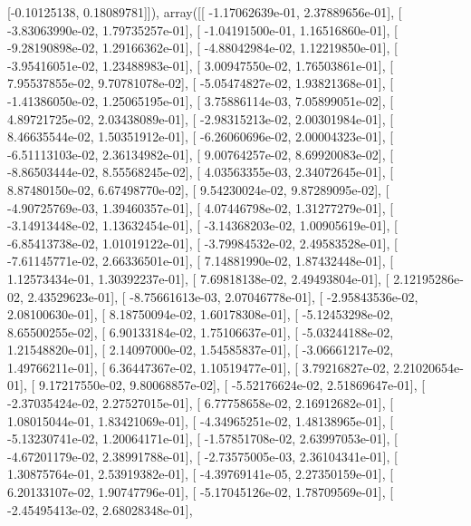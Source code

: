 \documentclass{article}
\begin{document}
       [-0.10125138,  0.18089781]]), array([[ -1.17062639e-01,   2.37889656e-01],
       [ -3.83063990e-02,   1.79735257e-01],
       [ -1.04191500e-01,   1.16516860e-01],
       [ -9.28190898e-02,   1.29166362e-01],
       [ -4.88042984e-02,   1.12219850e-01],
       [ -3.95416051e-02,   1.23488983e-01],
       [  3.00947550e-02,   1.76503861e-01],
       [  7.95537855e-02,   9.70781078e-02],
       [ -5.05474827e-02,   1.93821368e-01],
       [ -1.41386050e-02,   1.25065195e-01],
       [  3.75886114e-03,   7.05899051e-02],
       [  4.89721725e-02,   2.03438089e-01],
       [ -2.98315213e-02,   2.00301984e-01],
       [  8.46635544e-02,   1.50351912e-01],
       [ -6.26060696e-02,   2.00004323e-01],
       [ -6.51113103e-02,   2.36134982e-01],
       [  9.00764257e-02,   8.69920083e-02],
       [ -8.86503444e-02,   8.55568245e-02],
       [  4.03563355e-03,   2.34072645e-01],
       [  8.87480150e-02,   6.67498770e-02],
       [  9.54230024e-02,   9.87289095e-02],
       [ -4.90725769e-03,   1.39460357e-01],
       [  4.07446798e-02,   1.31277279e-01],
       [ -3.14913448e-02,   1.13632454e-01],
       [ -3.14368203e-02,   1.00905619e-01],
       [ -6.85413738e-02,   1.01019122e-01],
       [ -3.79984532e-02,   2.49583528e-01],
       [ -7.61145771e-02,   2.66336501e-01],
       [  7.14881990e-02,   1.87432448e-01],
       [  1.12573434e-01,   1.30392237e-01],
       [  7.69818138e-02,   2.49493804e-01],
       [  2.12195286e-02,   2.43529623e-01],
       [ -8.75661613e-03,   2.07046778e-01],
       [ -2.95843536e-02,   2.08100630e-01],
       [  8.18750094e-02,   1.60178308e-01],
       [ -5.12453298e-02,   8.65500255e-02],
       [  6.90133184e-02,   1.75106637e-01],
       [ -5.03244188e-02,   1.21548820e-01],
       [  2.14097000e-02,   1.54585837e-01],
       [ -3.06661217e-02,   1.49766211e-01],
       [  6.36447367e-02,   1.10519477e-01],
       [  3.79216827e-02,   2.21020654e-01],
       [  9.17217550e-02,   9.80068857e-02],
       [ -5.52176624e-02,   2.51869647e-01],
       [ -2.37035424e-02,   2.27527015e-01],
       [  6.77758658e-02,   2.16912682e-01],
       [  1.08015044e-01,   1.83421069e-01],
       [ -4.34965251e-02,   1.48138965e-01],
       [ -5.13230741e-02,   1.20064171e-01],
       [ -1.57851708e-02,   2.63997053e-01],
       [ -4.67201179e-02,   2.38991788e-01],
       [ -2.73575005e-03,   2.36104341e-01],
       [  1.30875764e-01,   2.53919382e-01],
       [ -4.39769141e-05,   2.27350159e-01],
       [  6.20133107e-02,   1.90747796e-01],
       [ -5.17045126e-02,   1.78709569e-01],
       [ -2.45495413e-02,   2.68028348e-01],
\end{document}
